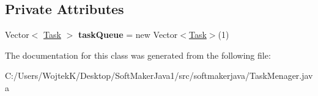 \subsection*{Private Attributes}
\begin{DoxyCompactItemize}
\item 
Vector$<$ \hyperlink{classsoftmakerjava_1_1_task}{Task} $>$ {\bfseries task\+Queue} = new Vector$<$\hyperlink{classsoftmakerjava_1_1_task}{Task}$>$(1)\hypertarget{classsoftmakerjava_1_1_task_menager_aa7c89025a8d1118ff5159061fb4f2a90}{}\label{classsoftmakerjava_1_1_task_menager_aa7c89025a8d1118ff5159061fb4f2a90}

\end{DoxyCompactItemize}


The documentation for this class was generated from the following file\+:\begin{DoxyCompactItemize}
\item 
C\+:/\+Users/\+Wojtek\+K/\+Desktop/\+Soft\+Maker\+Java1/src/softmakerjava/Task\+Menager.\+java\end{DoxyCompactItemize}
